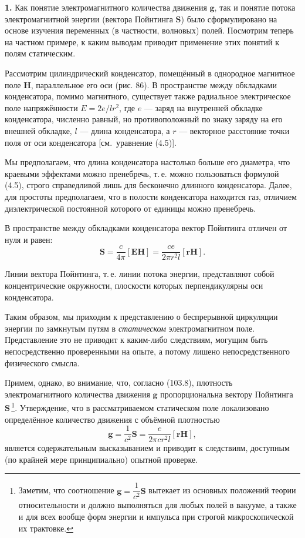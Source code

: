 \documentclass[a4paper,12pt]{article}
\begin{document}

\textbf{1.} Как понятие электромагнитного количества движения $\mathbf{g}$,
так и понятие потока электромагнитной энергии (вектора Пойнтинга
$\mathbf{S}$) было сформулировано на основе изучения переменных (в
частности, волновых) полей. Посмотрим теперь на частном примере, к каким
выводам приводит применение этих понятий к полям статическим.

Рассмотрим цилиндрический конденсатор, помещённый в однородное
магнитное поле $\mathbf{H}$, параллельное его оси (рис. 86). В
пространстве между обкладками конденсатора, помимо магнитного, существует
также радиальное электрическое поле напряжённости $E = 2e/lr^2$, где
$e$ — заряд на внутренней обкладке конденсатора, численно равный, но
противоположный по знаку заряду на его внешней обкладке, $l$ — длина
конденсатора, а $r$ — векторное расстояние точки поля от оси конденсатора
[см.\ уравнение (4.5)].

Мы предполагаем, что длина конденсатора настолько больше его диаметра,
что краевыми эффектами можно пренебречь, т.\,е. можно пользоваться
формулой (4.5), строго справедливой лишь для бесконечно длинного
конденсатора. Далее, для простоты предполагаем, что в полости конденсатора
находится газ, отличием диэлектрической постоянной которого от единицы
можно пренебречь.

В пространстве между обкладками конденсатора вектор Пойнтинга отличен
от нуля и равен:
$$
    \mathbf{S} = \frac{c}{4\pi}[\mathbf{E}\mathbf{H}]
               = \frac{ce}{2\pi r^2 l}[\mathbf{r}\mathbf{H}].
$$


Линии вектора Пойнтинга, т.\,е. линии потока энергии, представляют
собой концентрические окружности, плоскости которых перпендикулярны
оси конденсатора.

Таким образом, мы приходим к представлению о беспрерывной циркуляции
энергии по замкнутым путям в \textit{статическом} электромагнитном поле.
Представление это не приводит к каким-либо следствиям, могущим быть
непосредственно проверенными на опыте, а потому лишено непосредственного
физического смысла.

Примем, однако, во внимание, что, согласно (103.8), плотность
электромагнитного количества движения $\mathbf{g}$ пропорциональна
вектору Пойнтинга $\mathbf{S}$\,\footnote{Заметим, что соотношение
$\mathbf{g} = \dfrac{1}{c^2}\mathbf{S}$ вытекает из основных положений
теории относительности и должно выполняться для любых полей в вакууме,
а также и для всех вообще форм энергии и импульса при строгой
микроскопической их трактовке.}. Утверждение, что в рассматриваемом
статическом поле локализовано определённое количество движения с
объёмной плотностью
\begin{equation}
    \mathbf{g} = \frac{1}{c^2}\mathbf{S} = \frac{e}{2\pi cr^2 l}[\mathbf{r}\mathbf{H}],
    \tag{104.1}
\end{equation}
является содержательным высказыванием и приводит к следствиям, доступным
(по крайней мере принципиально) опытной проверке.
\end{document}
